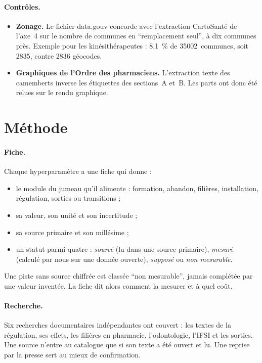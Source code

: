 \paragraph{Contrôles.}
\begin{itemize}
\item \textbf{Zonage.} Le fichier data.gouv concorde avec l'extraction
  CartoSanté de l'axe~4 sur le nombre de communes en \enquote{remplacement
  seul}, à dix communes près\derive. Exemple pour les kinésithérapeutes :
  8,1~\% de \num{35002}~communes, soit \num{2835}\derive{}, contre
  \num{2836}\mesure{} géocodes.
\item \textbf{Graphiques de l'Ordre des pharmaciens.} L'extraction texte
  des camemberts inverse les étiquettes des sections~A et~B. Les parts ont
  donc été relues sur le rendu graphique.
\end{itemize}

\section{Méthode}

\paragraph{Fiche.}
Chaque hyperparamètre a une fiche qui donne :
\begin{itemize}
\item le module du jumeau qu'il alimente : formation, abandon, filières,
  installation, régulation, sorties ou transitions ;
\item sa valeur, son unité et son incertitude ;
\item sa source primaire et son millésime ;
\item un statut parmi quatre : \emph{sourcé} (lu dans une source
  primaire), \emph{mesuré} (calculé par nous sur une donnée ouverte),
  \emph{supposé} ou \emph{non mesurable}.
\end{itemize}
Une piste sans source chiffrée est classée \enquote{non mesurable}, jamais
complétée par une valeur inventée. La fiche dit alors comment la mesurer et
à quel coût.

\paragraph{Recherche.}
Six recherches documentaires indépendantes ont couvert : les textes de la
régulation, ses effets, les filières en pharmacie, l'odontologie, l'IFSI et
les sorties. Une source n'entre au catalogue que si son texte a été ouvert
et lu. Une reprise par la presse sert au mieux de confirmation.

